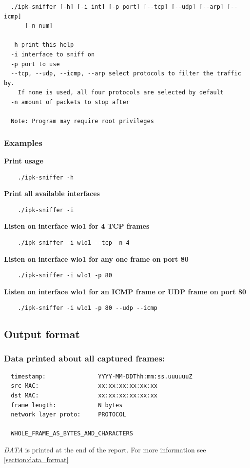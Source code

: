 \documentclass[a4paper]{article}
\begin{document}
  \begin{verbatim}
  ./ipk-sniffer [-h] [-i int] [-p port] [--tcp] [--udp] [--arp] [--icmp] 
      [-n num]

  -h print this help
  -i interface to sniff on
  -p port to use
  --tcp, --udp, --icmp, --arp select protocols to filter the traffic by.
    If none is used, all four protocols are selected by default
  -n amount of packets to stop after

  Note: Program may require root privileges
  \end{verbatim}


  \subsubsection{Examples}

  \noindent
  \textbf{Print usage}
  \begin{verbatim}
    ./ipk-sniffer -h
  \end{verbatim}

  \noindent
  \textbf{Print all available interfaces}
  \begin{verbatim}
    ./ipk-sniffer -i
  \end{verbatim}

  \noindent
  \textbf{Listen on interface wlo1 for 4 TCP frames}
  \begin{verbatim}
    ./ipk-sniffer -i wlo1 --tcp -n 4
  \end{verbatim}

  \noindent
  \textbf{Listen on interface wlo1 for any one frame on port 80}
  \begin{verbatim}
    ./ipk-sniffer -i wlo1 -p 80
  \end{verbatim}

  \noindent
  \textbf{Listen on interface wlo1 for an ICMP frame or  UDP frame on port 80}
  \begin{verbatim}
    ./ipk-sniffer -i wlo1 -p 80 --udp --icmp
  \end{verbatim}


  \subsection{Output format}

  \subsubsection{Data printed about all captured frames:}
    
  \begin{verbatim}
  timestamp:               YYYY-MM-DDThh:mm:ss.uuuuuuZ
  src MAC:                 xx:xx:xx:xx:xx:xx
  dst MAC:                 xx:xx:xx:xx:xx:xx
  frame length:            N bytes
  network layer proto:     PROTOCOL

  WHOLE_FRAME_AS_BYTES_AND_CHARACTERS
  \end{verbatim}
  \begin{notes}
    \item \textit{DATA} is printed at the end of the report. For more 
      information see \ref{section:data_format}
  \end{notes}
\end{document}
